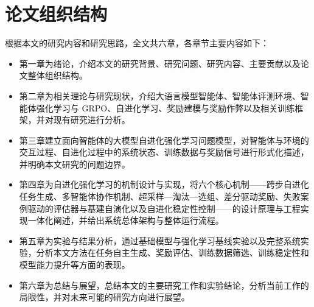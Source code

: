 \section{论文组织结构}

根据本文的研究内容和研究思路，全文共六章，各章节主要内容如下：

\begin{itemize}
\item 第一章为绪论，介绍本文的研究背景、研究问题、研究内容、主要贡献以及论文整体组织结构。
\item 第二章为相关理论与研究现状，介绍大语言模型智能体、智能体评测环境、智能体强化学习与 GRPO、自进化学习、奖励建模与奖励作弊以及相关训练框架，并对现有研究进行分析。
\item 第三章建立面向智能体的大模型自进化强化学习问题模型，对智能体与环境的交互过程、自进化过程中的系统状态、训练数据与奖励信号进行形式化描述，并明确本文研究的问题边界。
\item 第四章为自进化强化学习的机制设计与实现，将六个核心机制——跨步自进化任务生成、多智能体协作机制、超采样—淘汰—选组、差分驱动奖励、失败案例驱动的评估器与基建自演化以及自进化稳定性控制——的设计原理与工程实现一体化阐述，并给出系统总体架构与整体运行流程。
\item 第五章为实验与结果分析，通过基础模型与强化学习基线实验以及完整系统实验，分析本文方法在任务自主生成、奖励评估、训练数据筛选、训练稳定性和模型能力提升等方面的表现。
\item 第六章为总结与展望，总结本文的主要研究工作和实验结论，分析当前工作的局限性，并对未来可能的研究方向进行展望。
\end{itemize}
